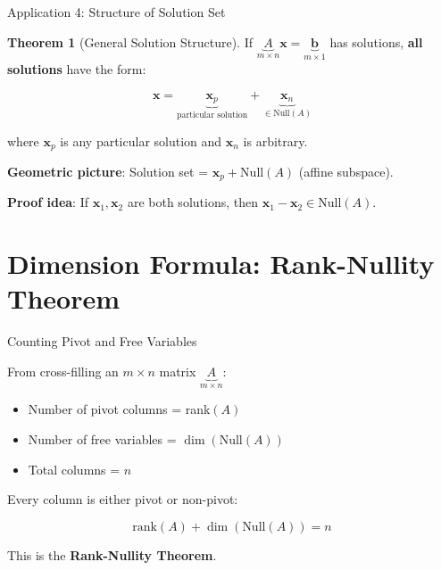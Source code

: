 \documentclass[10pt]{beamer}
\theoremstyle{definition}
\newtheorem{thm}{Theorem}[section]
\newcommand{\x}[1]{\alert{\textbf{#1}}}
\begin{document}
\begin{frame}{Application 4: Structure of Solution Set}

\begin{thm}[General Solution Structure]
If $\underbrace{A}_{m \times n}\mathbf{x} = \underbrace{\mathbf{b}}_{m \times 1}$ has solutions, \textbf{all solutions} have the form:

$$\mathbf{x} = \underbrace{\mathbf{x}_p}_{\text{particular solution}} + \underbrace{\mathbf{x}_n}_{\in \text{Null}(A)}$$

where $\mathbf{x}_p$ is any particular solution and $\mathbf{x}_n$ is arbitrary.
\end{thm}

\vspace{0.5em}

\x{Geometric picture}: Solution set = $\mathbf{x}_p + \text{Null}(A)$ (affine subspace).

\vspace{0.5em}

\x{Proof idea}: If $\mathbf{x}_1, \mathbf{x}_2$ are both solutions, then $\mathbf{x}_1 - \mathbf{x}_2 \in \text{Null}(A)$.

\end{frame}

\section{Dimension Formula: Rank-Nullity Theorem}

\begin{frame}{Counting Pivot and Free Variables}

From cross-filling an $m \times n$ matrix $\underbrace{A}_{m \times n}$:

\begin{itemize}
\item Number of pivot columns = rank$(A)$
\item Number of free variables = $\dim(\text{Null}(A))$
\item Total columns = $n$
\end{itemize}

\vspace{1em}

Every column is either pivot or non-pivot:

$$\text{rank}(A) + \dim(\text{Null}(A)) = n$$

\vspace{1em}

This is the \x{Rank-Nullity Theorem}.

\end{frame}
\end{document}
